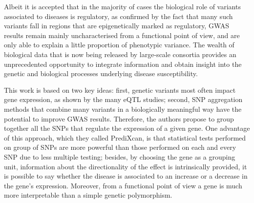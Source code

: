 \documentclass[../main.tex]{subfiles}
\begin{document}
Albeit it is accepted that in the majority of cases the biological role 
of variants associated to diseases is regulatory, as confirmed by the 
fact that many such variants fall in regions that are epigenetically 
marked as regulatory, GWAS results remain mainly uncharacterised from a 
functional point of view, and are only able to explain a little 
proportion of phenotypic variance. The wealth of biological data that is 
now being released by large-scale consortia provides an unprecedented 
opportunity to integrate information and obtain insight into the genetic 
and biological processes underlying disease 
susceptibility.

This work is based on two key ideas: first, genetic variants most often 
impact gene expression, as shown by the many eQTL studies; second, SNP 
aggregation methods that combine many variants in a biologically 
meaningful way have the potential to improve GWAS results. Therefore, 
the authors propose to group together all the SNPs that regulate the 
expression of a given gene. One advantage of this approach, which they 
called PrediXcan, is that statistical tests performed on group of SNPs 
are more powerful than those performed on each and every SNP due to less 
multiple testing; besides, by choosing the gene as a grouping unit, 
information about the directionality of the effect is intrinsically 
provided, \ie it is possible to say whether the disease is associated to 
an increase or a decrease in the gene's expression. Moreover, from a 
functional point of view a gene is much more interpretable than a simple 
genetic polymorphism.
\end{document}
